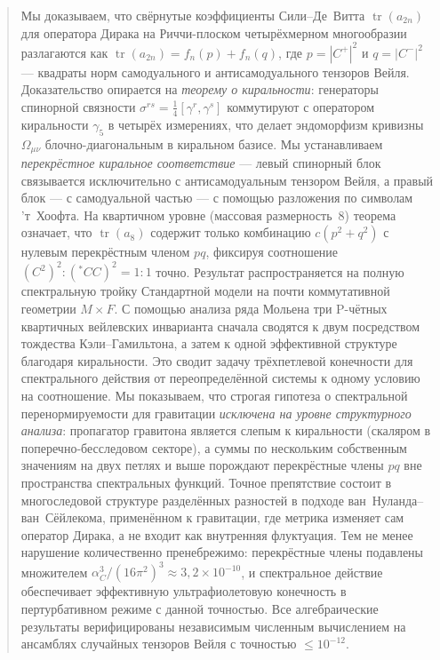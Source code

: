 \documentclass[12pt,a4paper]{article}
\theoremstyle{definition}
\theoremstyle{remark}
\newcommand{\tr}{\operatorname{tr}}
\begin{document}
\begin{abstract}
Мы доказываем, что свёрнутые коэффициенты Сили--Де~Витта $\tr(a_{2n})$ для
оператора Дирака на Риччи-плоском четырёхмерном многообразии разлагаются как
$\tr(a_{2n}) = f_n(p) + f_n(q)$, где $p = |C^+|^2$ и $q = |C^-|^2$ ---
квадраты норм самодуального и антисамодуального тензоров Вейля.
Доказательство опирается на \emph{теорему о киральности}: генераторы
спинорной связности $\sigma^{rs} = \frac{1}{4}[\gamma^r, \gamma^s]$
коммутируют с оператором киральности $\gamma_5$ в четырёх измерениях, что
делает эндоморфизм кривизны $\Omega_{\mu\nu}$ блочно-диагональным в
киральном базисе.  Мы устанавливаем \emph{перекрёстное киральное
соответствие} --- левый спинорный блок связывается исключительно с
антисамодуальным тензором Вейля, а правый блок --- с самодуальной
частью --- с помощью разложения по символам 'т~Хоофта.  На квартичном
уровне (массовая размерность~8) теорема означает, что $\tr(a_8)$ содержит
только комбинацию $c(p^2 + q^2)$ с нулевым перекрёстным членом $pq$,
фиксируя соотношение $(C^2)^2 : (\!{}^{\ast}\!CC)^2 = 1{:}1$ точно.
Результат распространяется на полную спектральную тройку Стандартной модели
на почти коммутативной геометрии $M \times F$.  С помощью анализа ряда
Мольена три P-чётных квартичных вейлевских инварианта
сначала сводятся к двум посредством тождества Кэли--Гамильтона, а затем к
одной эффективной структуре благодаря киральности.  Это сводит задачу
трёхпетлевой конечности для спектрального действия от переопределённой
системы к одному условию на соотношение.  Мы показываем, что строгая
гипотеза о спектральной перенормируемости для гравитации
\emph{исключена на уровне структурного анализа}: пропагатор гравитона является слепым к киральности
(скаляром в поперечно-бесследовом секторе), а суммы по нескольким собственным значениям на
двух петлях и выше порождают перекрёстные члены $pq$ вне пространства
спектральных функций.  Точное препятствие состоит в многоследовой
структуре разделённых разностей в подходе ван~Нуланда--ван~Сёйлекома,
применённом к гравитации, где метрика изменяет сам оператор Дирака, а не
входит как внутренняя флуктуация.  Тем не менее нарушение количественно
пренебрежимо: перекрёстные члены подавлены множителем
$\alpha_C^3/(16\pi^2)^3 \approx 3{,}2 \times 10^{-10}$, и спектральное
действие обеспечивает эффективную ультрафиолетовую конечность в
пертурбативном режиме с данной точностью.  Все алгебраические результаты
верифицированы независимым численным вычислением на ансамблях случайных
тензоров Вейля с точностью $\leq 10^{-12}$.
\end{abstract}
\end{document}
